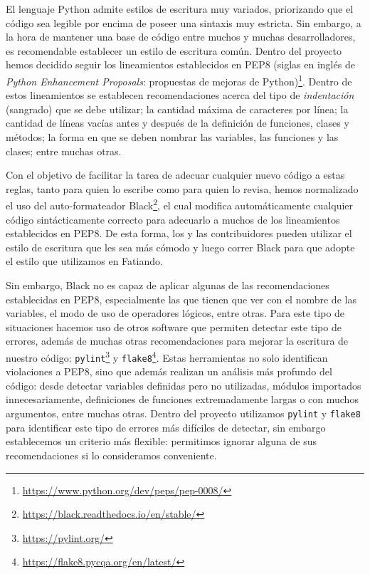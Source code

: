 El lenguaje Python admite estilos de escritura muy variados, priorizando que el
código sea legible por encima de poseer una sintaxis muy estricta.
Sin embargo, a la hora de mantener una base de código entre muchos y muchas
desarrolladores, es recomendable establecer un estilo de escritura común.
Dentro del proyecto hemos decidido seguir los lineamientos establecidos en
PEP8 (siglas en inglés de \emph{Python Enhancement Proposals}: propuestas de
mejoras de Python)\footnote{\url{https://www.python.org/dev/peps/pep-0008/}}.
Dentro de estos lineamientos se establecen recomendaciones acerca del tipo de
\emph{indentación} (sangrado) que se debe utilizar; la cantidad máxima de
caracteres por línea; la cantidad de líneas vacías antes y después de la
definición de funciones, clases y métodos; la forma en que se deben nombrar las
variables, las funciones y las clases; entre muchas otras.

Con el objetivo de facilitar la tarea de adecuar cualquier nuevo código a estas
reglas, tanto para quien lo escribe como para quien lo revisa, hemos
normalizado el uso del auto-formateador
Black\footnote{\url{https://black.readthedocs.io/en/stable/}}, el cual modifica
automáticamente cualquier código sintácticamente correcto para adecuarlo
a muchos de los lineamientos establecidos en PEP8.
De esta forma, los y las contribuidores pueden utilizar el estilo de escritura que
les sea más cómodo y luego correr Black para que adopte el estilo que
utilizamos en Fatiando.

Sin embargo, Black no es capaz de aplicar algunas de las recomendaciones
establecidas en PEP8, especialmente las que tienen que ver con el nombre de las
variables, el modo de uso de operadores lógicos, entre otras.
Para este tipo de situaciones hacemos uso de otros software que permiten detectar
este tipo de errores, además de muchas otras recomendaciones para mejorar la
escritura de nuestro código:
\texttt{pylint}\footnote{\url{https://pylint.org/}} y
\texttt{flake8}\footnote{\url{https://flake8.pycqa.org/en/latest/}}.
Estas herramientas no solo identifican violaciones a PEP8, sino que además
realizan un análisis más profundo del código: desde detectar variables
definidas pero no utilizadas, módulos importados innecesariamente, definiciones
de funciones extremadamente largas o con muchos argumentos, entre muchas otras.
Dentro del proyecto utilizamos \texttt{pylint} y \texttt{flake8} para
identificar este tipo de errores más difíciles de detectar, sin embargo
establecemos un criterio más flexible: permitimos ignorar alguna de sus
recomendaciones si lo consideramos conveniente.

